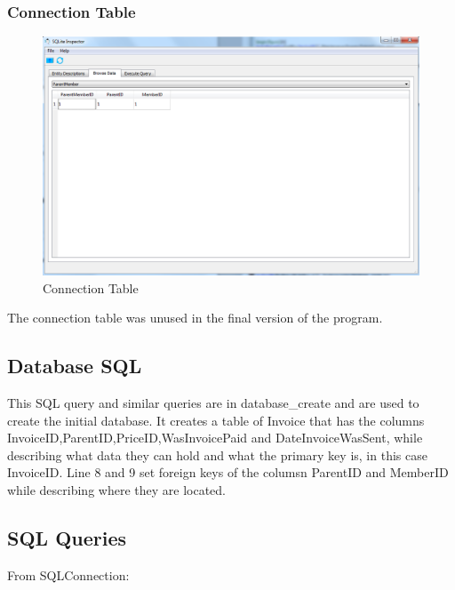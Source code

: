 \subsubsection{Connection Table}
\begin{figure}[H]
\includegraphics[width=\textwidth]{./Maintenance/Images/DatabaseParentMember.png}
    \caption{Connection Table} \label{fig:connection_table}
\end{figure}
 
The connection table was unused in the final version of the program.

\subsection{Database SQL}


This SQL query and similar queries are in database\_create and are used to create the initial database. It creates a table of  Invoice that has the columns InvoiceID,ParentID,PriceID,WasInvoicePaid and DateInvoiceWasSent, while describing what data they can hold and what the primary key is, in this case InvoiceID. Line 8 and 9 set foreign keys of the columsn ParentID and MemberID while describing where they are located.

\subsection{SQL Queries}

From SQLConnection:


